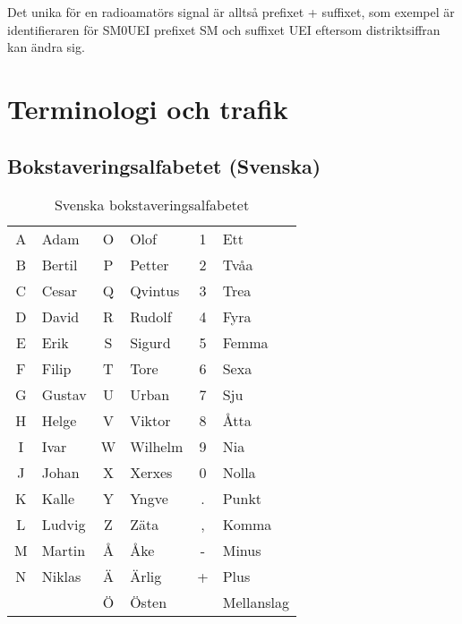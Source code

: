 Det unika för en radioamatörs signal är alltså prefixet + suffixet, som exempel
är identifieraren för SM0UEI prefixet SM och suffixet UEI eftersom
distriktsiffran kan ändra sig.

\section{Terminologi och trafik}

\subsection{Bokstaveringsalfabetet (Svenska)}

\begin{table}[H]
	\centering
\begin{longtable}{cl|cl|cl }
	A & Adam   & O & Olof    & 1 & Ett        \\
	B & Bertil & P & Petter  & 2 & Tvåa       \\
	C & Cesar  & Q & Qvintus & 3 & Trea       \\
	D & David  & R & Rudolf  & 4 & Fyra       \\
	E & Erik   & S & Sigurd  & 5 & Femma      \\
	F & Filip  & T & Tore    & 6 & Sexa       \\
	G & Gustav & U & Urban   & 7 & Sju        \\
	H & Helge  & V & Viktor  & 8 & Åtta       \\
	I & Ivar   & W & Wilhelm & 9 & Nia        \\
	J & Johan  & X & Xerxes  & 0 & Nolla      \\
	K & Kalle  & Y & Yngve   & . & Punkt      \\
	L & Ludvig & Z & Zäta    & , & Komma      \\
	M & Martin & Å & Åke     & - & Minus      \\
	N & Niklas & Ä & Ärlig   & + & Plus       \\
	  &        & Ö & Östen   &   & Mellanslag \\
\end{longtable}
\caption{Svenska bokstaveringsalfabetet}
\end{table}

